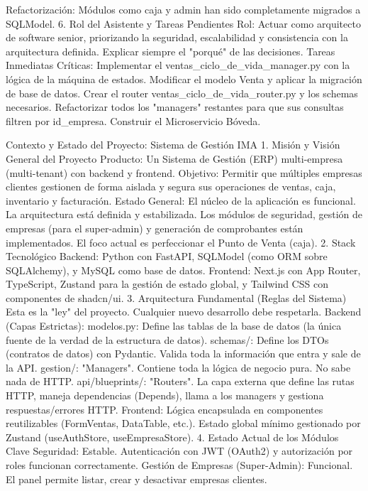 Refactorización: Módulos como caja y admin han sido completamente migrados a SQLModel.
6. Rol del Asistente y Tareas Pendientes
Rol: Actuar como arquitecto de software senior, priorizando la seguridad, escalabilidad y consistencia con la arquitectura definida. Explicar siempre el "porqué" de las decisiones.
Tareas Inmediatas Críticas:
Implementar el ventas_ciclo_de_vida_manager.py con la lógica de la máquina de estados.
Modificar el modelo Venta y aplicar la migración de base de datos.
Crear el router ventas_ciclo_de_vida_router.py y los schemas necesarios.
Refactorizar todos los "managers" restantes para que sus consultas filtren por id_empresa.
Construir el Microservicio Bóveda.

Contexto y Estado del Proyecto: Sistema de Gestión IMA
1. Misión y Visión General del Proyecto
Producto: Un Sistema de Gestión (ERP) multi-empresa (multi-tenant) con backend y frontend.
Objetivo: Permitir que múltiples empresas clientes gestionen de forma aislada y segura sus operaciones de ventas, caja, inventario y facturación.
Estado General: El núcleo de la aplicación es funcional. La arquitectura está definida y estabilizada. Los módulos de seguridad, gestión de empresas (para el super-admin) y generación de comprobantes están implementados. El foco actual es perfeccionar el Punto de Venta (caja).
2. Stack Tecnológico
Backend: Python con FastAPI, SQLModel (como ORM sobre SQLAlchemy), y MySQL como base de datos.
Frontend: Next.js con App Router, TypeScript, Zustand para la gestión de estado global, y Tailwind CSS con componentes de shadcn/ui.
3. Arquitectura Fundamental (Reglas del Sistema)
Esta es la "ley" del proyecto. Cualquier nuevo desarrollo debe respetarla.
Backend (Capas Estrictas):
modelos.py: Define las tablas de la base de datos (la única fuente de la verdad de la estructura de datos).
schemas/: Define los DTOs (contratos de datos) con Pydantic. Valida toda la información que entra y sale de la API.
gestion/: "Managers". Contiene toda la lógica de negocio pura. No sabe nada de HTTP.
api/blueprints/: "Routers". La capa externa que define las rutas HTTP, maneja dependencias (Depends), llama a los managers y gestiona respuestas/errores HTTP.
Frontend:
Lógica encapsulada en componentes reutilizables (FormVentas, DataTable, etc.).
Estado global mínimo gestionado por Zustand (useAuthStore, useEmpresaStore).
4. Estado Actual de los Módulos Clave
Seguridad: Estable. Autenticación con JWT (OAuth2) y autorización por roles funcionan correctamente.
Gestión de Empresas (Super-Admin): Funcional. El panel permite listar, crear y desactivar empresas clientes.
